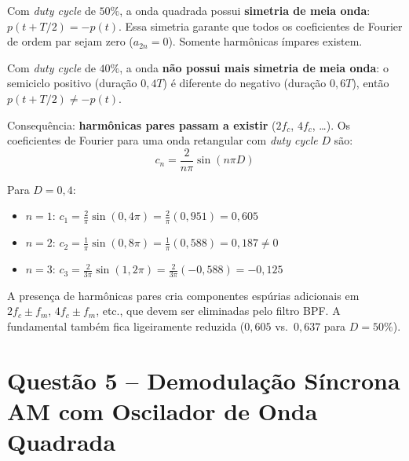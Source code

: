 \documentclass[11pt,a4paper]{article}
\begin{document}
\begin{resolucao}

Com \textit{duty cycle} de $50\%$, a onda quadrada possui \textbf{simetria de meia onda}: $p(t + T/2) = -p(t)$. Essa simetria garante que todos os coeficientes de Fourier de ordem par sejam zero ($a_{2n} = 0$). Somente harmônicas ímpares existem.

Com \textit{duty cycle} de $40\%$, a onda \textbf{não possui mais simetria de meia onda}: o semiciclo positivo (duração $0{,}4T$) é diferente do negativo (duração $0{,}6T$), então $p(t + T/2) \neq -p(t)$.

Consequência: \textbf{harmônicas pares passam a existir} ($2f_c$, $4f_c$, \ldots). Os coeficientes de Fourier para uma onda retangular com \textit{duty cycle} $D$ são:
\[
  c_n = \frac{2}{n\pi}\sin(n\pi D)
\]

Para $D = 0{,}4$:
\begin{itemize}
  \item $n = 1$: $c_1 = \frac{2}{\pi}\sin(0{,}4\pi) = \frac{2}{\pi}(0{,}951) = 0{,}605$
  \item $n = 2$: $c_2 = \frac{1}{\pi}\sin(0{,}8\pi) = \frac{1}{\pi}(0{,}588) = 0{,}187 \neq 0$
  \item $n = 3$: $c_3 = \frac{2}{3\pi}\sin(1{,}2\pi) = \frac{2}{3\pi}(-0{,}588) = -0{,}125$
\end{itemize}

A presença de harmônicas pares cria componentes espúrias adicionais em $2f_c \pm f_m$, $4f_c \pm f_m$, etc., que devem ser eliminadas pelo filtro BPF. A fundamental também fica ligeiramente reduzida ($0{,}605$ vs.\ $0{,}637$ para $D = 50\%$).
\end{resolucao}


\section*{Questão 5 -- Demodulação Síncrona AM com Oscilador de Onda Quadrada}
\end{document}
